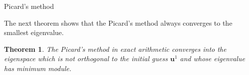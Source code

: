 \documentclass[preprint,12pt]{elsarticle}
\newtheorem{theorem}{Theorem}[section]
\newtheorem{lemma}[theorem]{Lemma}
\begin{document}
\begin{algorithm}[H] \caption{Picard's method} \label{alg:picard} 
\begin{algorithmic}


\REPEAT

\end{algorithmic}
\end{algorithm}




The next theorem shows that the Picard's method always converges to the smallest eigenvalue.

\begin{theorem}\label{th:picard_conv}
The Picard's method in exact arithmetic converges into the eigenspace which is not orthogonal to the initial guess $\mathbf{u}^1$ and whose eigenvalue has minimum module.
\end{theorem}
\end{document}
